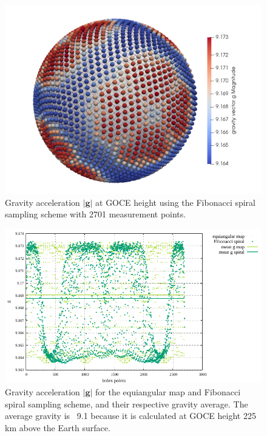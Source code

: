 \begin{figure}[h!]
\centering
\includegraphics[scale=.4]{../../benchmarks/gravity_prem/doc/spiral_prem.png}
\caption{Gravity acceleration $|{\mathbf g}|$ at GOCE height using the Fibonacci spiral sampling scheme with 2701 measurement points.}
\label{fig:gravitypremspirals}
\end{figure}

\begin{figure}[h!]
\centering
\includegraphics[scale=1.1]{../../benchmarks/gravity_prem/doc/stats_gravity_prem_g.pdf}
\caption{Gravity acceleration $|{\mathbf g}|$ for the equiangular map and Fibonacci spiral sampling scheme, and their respective gravity average. The average gravity is ~9.1 because it is calculated at GOCE height 225 km above the Earth surface.}
\label{fig:gravityprem}
\end{figure}
